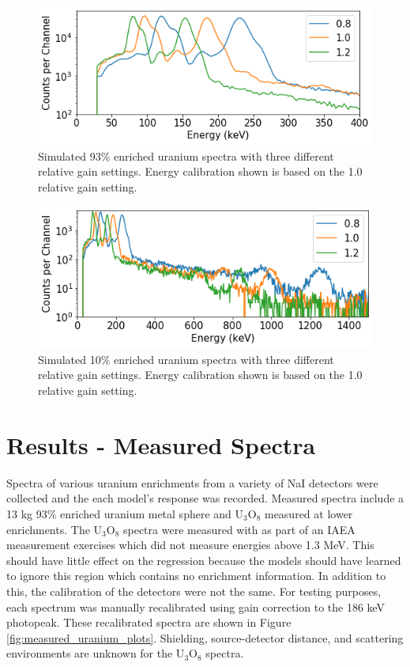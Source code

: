 \begin{figure}[H]
	\centering
	\includegraphics[width=0.8\linewidth]{images/simulated_uranium_calibration.png}
	\caption{Simulated 93\% enriched uranium spectra with three different relative gain settings. Energy calibration shown is based on the 1.0 relative gain setting.}
	\label{fig:simulated_uranium_calibration_93pct}
\end{figure}

\begin{figure}[H]
	\centering
	\includegraphics[width=0.8\linewidth]{images/simulated_uranium_calibration_1500kev.png}
	\caption{Simulated 10\% enriched uranium spectra with three different relative gain settings. Energy calibration shown is based on the 1.0 relative gain setting.}
	\label{fig:simulated_uranium_calibration_10pct}
\end{figure}

\section{Results - Measured Spectra}

Spectra of various uranium enrichments from a variety of NaI detectors were collected and the each model's response was recorded. Measured spectra include a 13 kg 93\% enriched uranium metal sphere \cite{Rothe1997} and U$_{3}$O$_{8}$ measured at lower enrichments. The U$_{3}$O$_{8}$ spectra were measured with as part of an IAEA measurement exercises which did not measure energies above 1.3 MeV. This should have little effect on the regression because the models should have learned to ignore this region which contains no enrichment information. In addition to this, the calibration of the detectors were not the same. For testing purposes, each spectrum was manually recalibrated using gain correction to the 186 keV photopeak. These recalibrated spectra are shown in Figure \ref{fig:measured_uranium_plots}. Shielding, source-detector distance, and scattering environments are unknown for the U$_{3}$O$_{8}$ spectra.

